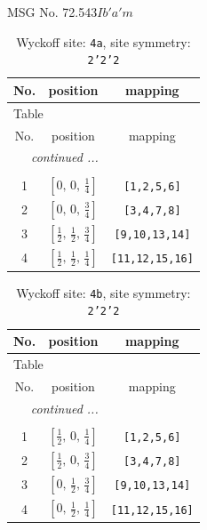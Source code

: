 \documentclass[fleqn,8pt]{jsarticle}
\begin{document}
\setcounter{MaxMatrixCols}{32}

\renewcommand{\tablename}{Table~}
\renewcommand{\figurename}{Figure~}
\begin{center}
\LARGE
MSG No. 72.543\quad$Ib'a'm$
\end{center}
\renewcommand{\arraystretch}{1.2}
\begin{longtable}{ccc}
\caption{Wyckoff site: {\tt 4a}, site symmetry: {\tt 2'2'2}}
 \\
 \hline \hline
No. & position & mapping \\ \hline \endfirsthead

\multicolumn{2}{l}{\tablename\ \thetable{}} \\
 \hline \hline
No. & position & mapping \\ \hline \endhead

 \hline \hline
\multicolumn{2}{r}{\footnotesize\it continued ...} \\ \endfoot

 \hline \hline
\multicolumn{2}{r}{} \\ \endlastfoot

1 & $\left[ 0,\, 0,\, \frac{1}{4} \right]$ & {\tt [1,2,5,6]} \\ \hline
2 & $\left[ 0,\, 0,\, \frac{3}{4} \right]$ & {\tt [3,4,7,8]} \\ \hline
3 & $\left[ \frac{1}{2},\, \frac{1}{2},\, \frac{3}{4} \right]$ & {\tt [9,10,13,14]} \\ \hline
4 & $\left[ \frac{1}{2},\, \frac{1}{2},\, \frac{1}{4} \right]$ & {\tt [11,12,15,16]} \\
\end{longtable}
\renewcommand{\arraystretch}{1.2}
\begin{longtable}{ccc}
\caption{Wyckoff site: {\tt 4b}, site symmetry: {\tt 2'2'2}}
 \\
 \hline \hline
No. & position & mapping \\ \hline \endfirsthead

\multicolumn{2}{l}{\tablename\ \thetable{}} \\
 \hline \hline
No. & position & mapping \\ \hline \endhead

 \hline \hline
\multicolumn{2}{r}{\footnotesize\it continued ...} \\ \endfoot

 \hline \hline
\multicolumn{2}{r}{} \\ \endlastfoot

1 & $\left[ \frac{1}{2},\, 0,\, \frac{1}{4} \right]$ & {\tt [1,2,5,6]} \\ \hline
2 & $\left[ \frac{1}{2},\, 0,\, \frac{3}{4} \right]$ & {\tt [3,4,7,8]} \\ \hline
3 & $\left[ 0,\, \frac{1}{2},\, \frac{3}{4} \right]$ & {\tt [9,10,13,14]} \\ \hline
4 & $\left[ 0,\, \frac{1}{2},\, \frac{1}{4} \right]$ & {\tt [11,12,15,16]} \\
\end{longtable}
\end{document}
